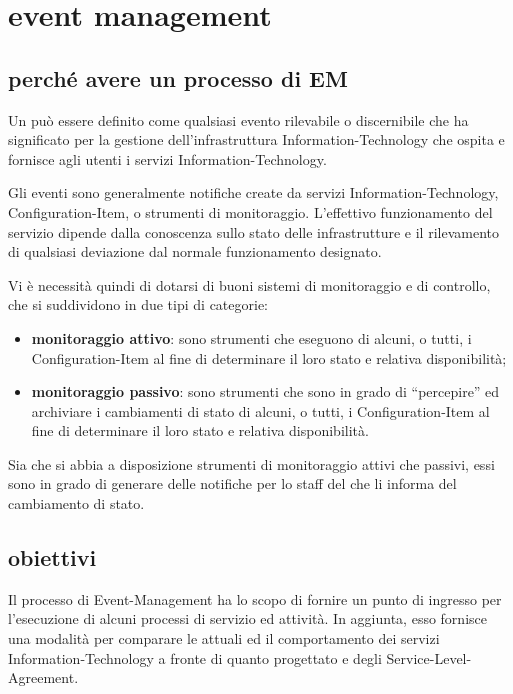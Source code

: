 %
%
\section[Event management]{event management}
\label{prc-event}

\subsection[Perché avere un processo di EM]{perché avere un processo di EM}
\label{prc-event-why}
Un  può essere definito come qualsiasi evento rilevabile o discernibile che ha significato per la gestione dell'infrastruttura \acs{Information-Technology} che ospita e fornisce agli utenti i servizi \acs{Information-Technology}.

Gli eventi sono generalmente notifiche create da servizi \acs{Information-Technology}, \ac{Configuration-Item}, o strumenti di monitoraggio. L'effettivo funzionamento del servizio dipende dalla conoscenza sullo stato delle infrastrutture e il rilevamento di qualsiasi deviazione dal normale funzionamento designato.

Vi è necessità quindi di dotarsi di buoni sistemi di monitoraggio e di controllo, che si suddividono in due tipi di categorie:

\begin{itemize}
\item{\textbf{monitoraggio attivo}: sono strumenti che eseguono  di alcuni, o tutti, i \ac{Configuration-Item} al fine di determinare il loro stato e relativa disponibilità;}
\item{\textbf{monitoraggio passivo}: sono strumenti che sono in grado di ``percepire'' ed archiviare i cambiamenti di stato di alcuni, o tutti, i \ac{Configuration-Item} al fine di determinare il loro stato e relativa disponibilità.}
\end{itemize}

Sia che si abbia a disposizione strumenti di monitoraggio attivi che passivi, essi sono in grado di generare delle notifiche per lo staff del  che li informa del cambiamento di stato.

\subsection[Obiettivi]{obiettivi}
\label{prc-event-objectives}
Il processo di \ac{Event-Management} ha lo scopo di fornire un punto di ingresso per l'esecuzione di alcuni processi di servizio ed attività. In aggiunta, esso fornisce una modalità per comparare le attuali  ed il comportamento dei servizi \acs{Information-Technology} a fronte di quanto progettato e degli \ac{Service-Level-Agreement}.

